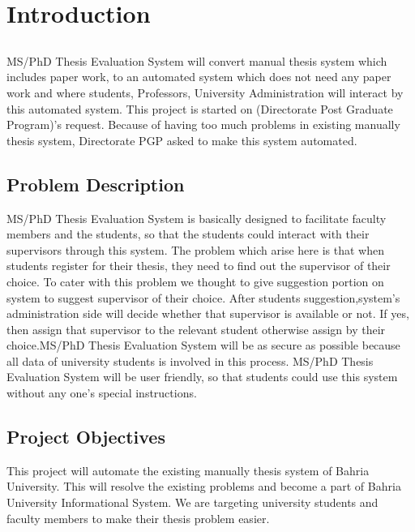 \chapter{Introduction} \label{chap:intro}


\section*{}

MS/PhD Thesis Evaluation System will convert manual thesis system which includes paper work, to an automated system which does not need any paper work and where students, Professors, University Administration will interact by this automated system. This project is started on (Directorate Post
Graduate Program)’s request. Because of having too much problems in existing manually thesis system, Directorate PGP asked to make this system automated.



	\section{Problem Description}
	MS/PhD Thesis Evaluation System is basically designed to facilitate faculty members and the students, so that the students could interact with their supervisors through this system. The problem which arise here is that when students register for their thesis, they need to find out the supervisor of their choice. To cater with this problem we thought to give suggestion portion on system to suggest supervisor of their choice. After students suggestion,system’s administration side will decide whether that supervisor is available or not. If yes, then assign that supervisor to the relevant student otherwise assign by their choice.MS/PhD Thesis Evaluation System will be as secure as possible because all data of university students is involved in this process.
MS/PhD Thesis Evaluation System will be user friendly, so that students could use this system without any one’s special instructions.
	
	\section{Project Objectives}
	This project will automate the existing manually thesis system of Bahria University. This will resolve the existing problems and become a part of Bahria University Informational System. We are targeting university students and faculty members to make their thesis problem easier. 
	
